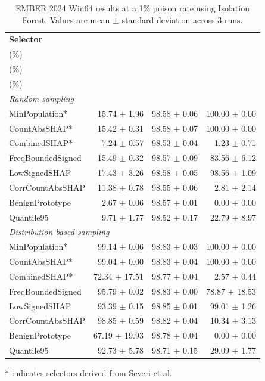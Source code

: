 \begin{table}[!t]
    \centering
    \caption{EMBER 2024 Win64 results at a 1\% poison rate using Isolation Forest. Values are mean $\pm$ standard deviation across 3 runs.}
    \label{tab:ember2024_1p_if}
    \setlength{\tabcolsep}{3.0pt}
    \renewcommand{\arraystretch}{1.08}
    \begin{tabular}{lrrr}
        \toprule
        \textbf{Selector} &
        \makecell{\textbf{ASR}\\($\%$)} &
        \makecell{\textbf{Clean accuracy}\\($\%$)} &
        \makecell{\textbf{Poison recall}\\($\%$)} \\
        \midrule
        \multicolumn{4}{l}{\textit{Random sampling}} \\
        MinPopulation*      & 15.74 $\pm$ 1.96 & 98.58 $\pm$ 0.06 & 100.00 $\pm$ 0.00 \\
        CountAbsSHAP*       & 15.42 $\pm$ 0.31 & 98.58 $\pm$ 0.07 & 100.00 $\pm$ 0.00 \\
        CombinedSHAP*       & 7.24 $\pm$ 0.57  & 98.53 $\pm$ 0.04 & 1.23 $\pm$ 0.71 \\
        FreqBoundedSigned   & 15.49 $\pm$ 0.32 & 98.57 $\pm$ 0.09 & 83.56 $\pm$ 6.12 \\
        LowSignedSHAP       & 17.43 $\pm$ 3.26 & 98.58 $\pm$ 0.05 & 98.56 $\pm$ 1.09 \\
        CorrCountAbsSHAP    & 11.38 $\pm$ 0.78 & 98.55 $\pm$ 0.06 & 2.81 $\pm$ 2.14 \\
        BenignPrototype     & 2.67 $\pm$ 0.06  & 98.57 $\pm$ 0.01 & 0.00 $\pm$ 0.00 \\
        Quantile95          & 9.71 $\pm$ 1.77  & 98.52 $\pm$ 0.17 & 22.79 $\pm$ 8.97 \\
        \midrule
        \multicolumn{4}{l}{\textit{Distribution-based sampling}} \\
        MinPopulation*      & 99.14 $\pm$ 0.06 & 98.83 $\pm$ 0.03 & 100.00 $\pm$ 0.00 \\
        CountAbsSHAP*       & 99.04 $\pm$ 0.00 & 98.83 $\pm$ 0.04 & 100.00 $\pm$ 0.00 \\
        CombinedSHAP*       & 72.34 $\pm$ 17.51 & 98.77 $\pm$ 0.04 & 2.57 $\pm$ 0.44 \\
        FreqBoundedSigned   & 95.79 $\pm$ 0.02 & 98.83 $\pm$ 0.00 & 78.87 $\pm$ 18.53 \\
        LowSignedSHAP       & 93.39 $\pm$ 0.15 & 98.85 $\pm$ 0.01 & 99.01 $\pm$ 1.26 \\
        CorrCountAbsSHAP    & 98.85 $\pm$ 0.59 & 98.82 $\pm$ 0.04 & 10.34 $\pm$ 3.13 \\
        BenignPrototype     & 67.19 $\pm$ 19.93 & 98.78 $\pm$ 0.04 & 0.00 $\pm$ 0.00 \\
        Quantile95          & 92.73 $\pm$ 5.78 & 98.71 $\pm$ 0.15 & 29.09 $\pm$ 1.77 \\
        \bottomrule
    \end{tabular}
    \vspace{0.5mm}
    \raggedright
    * indicates selectors derived from Severi et al.
\end{table}
